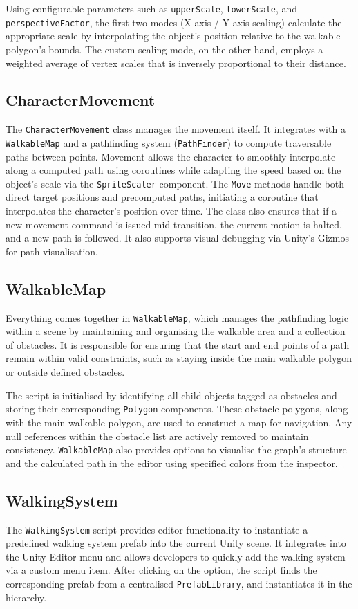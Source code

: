 Using configurable parameters such as \verb|upperScale|, \verb|lowerScale|, and \verb|perspectiveFactor|, the first two modes (X-axis / Y-axis scaling)  calculate the appropriate scale by interpolating the object's position relative to the walkable polygon’s bounds. The custom scaling mode, on the other hand, employs a weighted average of vertex scales that is inversely proportional to their distance. 


\subsection{CharacterMovement}
The \verb|CharacterMovement| class manages the movement itself. It integrates with a \verb|WalkableMap| and a pathfinding system (\verb|PathFinder|) to compute traversable paths between points. Movement allows the character to smoothly interpolate along a computed path using coroutines while adapting the speed based on the object's scale via the \verb|SpriteScaler| component. The \verb|Move| methods handle both direct target positions and precomputed paths, initiating a coroutine that interpolates the character’s position over time. The class also ensures that if a new movement command is issued mid-transition, the current motion is halted, and a new path is followed. It also supports visual debugging via Unity’s Gizmos for path visualisation.

 
\subsection{WalkableMap}
Everything comes together in \verb|WalkableMap|, which manages the pathfinding logic within a scene by maintaining and organising the walkable area and a collection of obstacles. It is responsible for ensuring that the start and end points of a path remain within valid constraints, such as staying inside the main walkable polygon or outside defined obstacles.

The script is initialised by identifying all child objects tagged as obstacles and storing their corresponding \verb|Polygon| components. These obstacle polygons, along with the main walkable polygon, are used to construct a map for navigation. Any null references within the obstacle list are actively removed to maintain consistency. \verb|WalkableMap| also provides options to visualise the graph's structure and the calculated path in the editor using specified colors from the inspector.

\subsection{WalkingSystem}
The \verb|WalkingSystem| script provides editor functionality to instantiate a predefined walking system prefab into the current Unity scene. It integrates into the Unity Editor menu and allows developers to quickly add the walking system via a custom menu item. After clicking on the option, the script finds the corresponding prefab from a centralised \verb|PrefabLibrary|, and instantiates it in the hierarchy.


